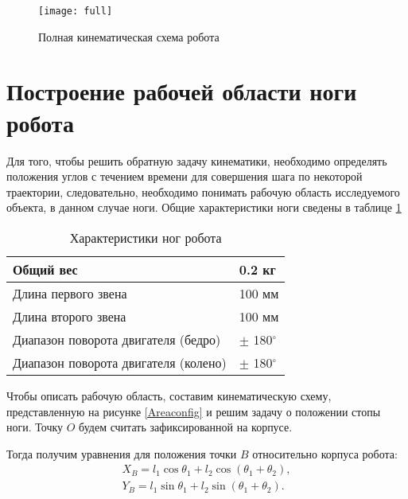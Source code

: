 \begin{figure}[h!]
	\begin{center}
		\texttt{[image: full]}
		\caption{Полная кинематическая схема робота}
		\label{full}
	\end{center}
\end{figure}

\section{Построение рабочей области ноги робота}\label{C2_2}
Для того, чтобы решить обратную задачу кинематики, необходимо определять положения углов с течением времени для совершения шага по некоторой траектории, следовательно, необходимо понимать рабочую область исследуемого объекта, в данном случае ноги. Общие характеристики ноги сведены в таблице \ref{tablParam}


\begin{table}[h]
	\begin{center}
		\caption{Характеристики ног робота}
		\label{tablParam}
		\begin{tabular}{| l | l |}
			\hline
			Общий вес   &    0.2 кг \\ \hline
			Длина первого звена & 100 мм\\ \hline
			Длина второго звена & 100 мм \\ \hline
			Диапазон поворота двигателя (бедро) & $\pm$ 180$^{\circ}$ \\ \hline
			Диапазон поворота двигателя (колено) & $\pm$ 180$^{\circ}$ \\ \hline
		\end{tabular}
	\end{center}
\end{table}

Чтобы описать рабочую область, составим кинематическую схему, представленную на рисунке \ref{Areaconfig} и решим задачу о положении стопы ноги. Точку $O$ будем считать зафиксированной на корпусе. 

Тогда получим уравнения для положения точки $B$ относительно корпуса робота:
\begin{equation}
\begin{array}{l}
	X_{B} = l_{1}\cos{\theta_1}+l_{2}\cos({\theta_1+\theta_2}),
	\\
	Y_{B} = l_{1}\sin{\theta_1}+l_{2}\sin({\theta_1+\theta_2}).
\end{array}
\end{equation}

